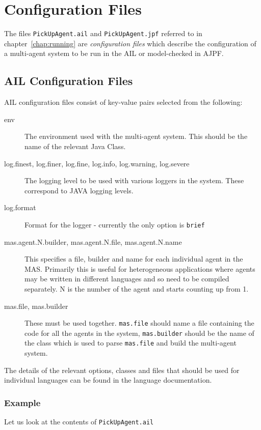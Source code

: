 \chapter{Configuration Files}
\label{chap:configuration}

The files \texttt{PickUpAgent.ail} and \texttt{PickUpAgent.jpf} referred to in chapter~\ref{chap:running} are \emph{configuration files} which describe the configuration of a multi-agent system to be run in the AIL or model-checked in AJPF.

\section{AIL Configuration Files}

AIL configuration files consist of key-value pairs selected from the following:

\begin{description}
\item[env] The environment used with the multi-agent system.  This should be the name of the relevant Java Class.  
\item[log.finest, log.finer, log.fine, log.info, log.warning, log.severe] The logging level to be used with various loggers in the system.  These correspond to JAVA logging levels.
\item[log.format] Format for the logger - currently the only option is \texttt{brief}
\item[mas.agent.N.builder, mas.agent.N.file, mas.agent.N.name] This specifies a file, builder and name for each individual agent in the MAS.  Primarily this is useful for heterogeneous applications where agents may be written in different languages and so need to be compiled separately.  N is the number of the agent and starts counting up from 1.
\item[mas.file, mas.builder] These must be used together.  \texttt{mas.file} should name a file containing the code for all the agents in the system, \texttt{mas.builder} should be the name of the class which is used to parse \texttt{mas.file} and build the multi-agent system.
\end{description}

The details of the relevant options, classes and files that should be used for individual languages can be found in the language documentation.

\subsection{Example}
Let us look at the contents of \texttt{PickUpAgent.ail}

